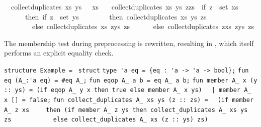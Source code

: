 \begin{isabellebody}
\ \ {\isachardoublequoteopen}collect{\isacharunderscore}duplicates\ xs\ ys\ {\isacharbrackleft}{\isacharbrackright}\ {\isacharequal}\ xs{\isachardoublequoteclose}\isanewline
\ \ {\isacharbar}\ {\isachardoublequoteopen}collect{\isacharunderscore}duplicates\ xs\ ys\ {\isacharparenleft}z{\isacharhash}zs{\isacharparenright}\ {\isacharequal}\ {\isacharparenleft}if\ z\ {\isasymin}\ set\ xs\isanewline
\ \ \ \ \ \ then\ if\ z\ {\isasymin}\ set\ ys\isanewline
\ \ \ \ \ \ \ \ then\ collect{\isacharunderscore}duplicates\ xs\ ys\ zs\isanewline
\ \ \ \ \ \ \ \ else\ collect{\isacharunderscore}duplicates\ xs\ {\isacharparenleft}z{\isacharhash}ys{\isacharparenright}\ zs\isanewline
\ \ \ \ \ \ else\ collect{\isacharunderscore}duplicates\ {\isacharparenleft}z{\isacharhash}xs{\isacharparenright}\ {\isacharparenleft}z{\isacharhash}ys{\isacharparenright}\ zs{\isacharparenright}{\isachardoublequoteclose}%
\endisatagquoteme
{\isafoldquoteme}%
%
\isadelimquoteme
%
\endisadelimquoteme
%
\begin{isamarkuptext}%
\noindent The membership test during preprocessing is rewritten,
  resulting in , which itself
  performs an explicit equality check.%
\end{isamarkuptext}%
\isamarkuptrue%
%
\isadelimquoteme
%
\endisadelimquoteme
%
\isatagquoteme
%
\begin{isamarkuptext}%
\isaverbatim%
\noindent%
\verb|structure Example = |\newline%
\verb|struct|\newline%
\newline%
\verb|type 'a eq = {eq : 'a -> 'a -> bool};|\newline%
\verb|fun eq (A_:'a eq) = #eq A_;|\newline%
\newline%
\verb|fun eqop A_ a b = eq A_ a b;|\newline%
\newline%
\verb|fun member A_ x (y :: ys) = (if eqop A_ y x then true else member A_ x ys)|\newline%
\verb|  |\verb,|,\verb| member A_ x [] = false;|\newline%
\newline%
\verb|fun collect_duplicates A_ xs ys (z :: zs) =|\newline%
\verb|  (if member A_ z xs|\newline%
\verb|    then (if member A_ z ys then collect_duplicates A_ xs ys zs|\newline%
\verb|           else collect_duplicates A_ xs (z :: ys) zs)|\newline%

\end{isamarkuptext}
\end{isabellebody}
